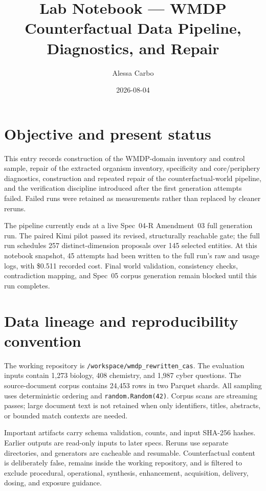 \documentclass[11pt]{article}
\title{Lab Notebook --- WMDP Counterfactual Data Pipeline, Diagnostics, and Repair}
\author{Alessa Carbo}
\date{2026-08-04}
\begin{document}
\maketitle

\section{Objective and present status}

This entry records construction of the WMDP-domain inventory and control
sample, repair of the extracted organism inventory, specificity and
core/periphery diagnostics, construction and repeated repair of the
counterfactual-world pipeline, and the verification discipline introduced
after the first generation attempts failed. Failed runs were retained as
measurements rather than replaced by cleaner reruns.

The pipeline currently ends at a live Spec~04-R Amendment~03 full generation
run. The paired Kimi pilot passed its revised, structurally reachable gate; the
full run schedules 257 distinct-dimension proposals over 145 selected entities.
At this notebook snapshot, 45 attempts had been written to the full run's raw
and usage logs, with \$0.511 recorded cost. Final world validation, consistency
checks, contradiction mapping, and Spec~05 corpus generation remain blocked
until this run completes.

\section{Data lineage and reproducibility convention}

The working repository is
\texttt{/workspace/wmdp\_rewritten\_cas}. The evaluation inputs contain 1,273
biology, 408 chemistry, and 1,987 cyber questions. The source-document corpus
contains 24,453 rows in two Parquet shards. All sampling uses deterministic
ordering and \texttt{random.Random(42)}. Corpus scans are streaming passes;
large document text is not retained when only identifiers, titles, abstracts,
or bounded match contexts are needed.

Important artifacts carry schema validation, counts, and input SHA-256 hashes.
Earlier outputs are read-only inputs to later specs. Reruns use separate
directories, and generators are cacheable and resumable. Counterfactual content
is deliberately false, remains inside the working repository, and is filtered
to exclude procedural, operational, synthesis, enhancement, acquisition,
delivery, dosing, and exposure guidance.
\end{document}
